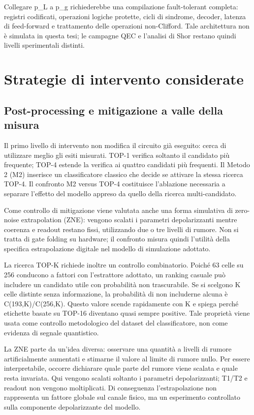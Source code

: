 Collegare p\_L a p\_g richiederebbe una compilazione fault-tolerant completa: registri codificati, operazioni logiche protette, cicli di sindrome, decoder, latenza di feed-forward e trattamento delle operazioni non-Clifford. Tale architettura non è simulata in questa tesi; le campagne QEC e l'analisi di Shor restano quindi livelli sperimentali distinti.

\section{Strategie di intervento considerate}\label{sec:finale_3_4}

\subsection{Post-processing e mitigazione a valle della misura}\label{sec:finale_3_4_1}

Il primo livello di intervento non modifica il circuito già eseguito: cerca di utilizzare meglio gli esiti misurati. TOP-1 verifica soltanto il candidato più frequente; TOP-4 estende la verifica ai quattro candidati più frequenti. Il Metodo 2 (M2) inserisce un classificatore classico che decide se attivare la stessa ricerca TOP-4. Il confronto M2 versus TOP-4 costituisce l'ablazione necessaria a separare l'effetto del modello appreso da quello della ricerca multi-candidato.

Come controllo di mitigazione viene valutata anche una forma simulativa di zero-noise extrapolation (ZNE): vengono scalati i parametri depolarizzanti mentre coerenza e readout restano fissi, utilizzando due o tre livelli di rumore. Non si tratta di gate folding su hardware; il confronto misura quindi l'utilità della specifica estrapolazione digitale nel modello di simulazione adottato.

La ricerca TOP-K richiede inoltre un controllo combinatorio. Poiché 63 celle su 256 conducono a fattori con l'estrattore adottato, un ranking casuale può includere un candidato utile con probabilità non trascurabile. Se si scelgono K celle distinte senza informazione, la probabilità di non includerne alcuna è C(193,K)/C(256,K). Questo valore scende rapidamente con K e spiega perché etichette basate su TOP-16 diventano quasi sempre positive. Tale proprietà viene usata come controllo metodologico del dataset del classificatore, non come evidenza di segnale quantistico.

La ZNE parte da un'idea diversa: osservare una quantità a livelli di rumore artificialmente aumentati e stimarne il valore al limite di rumore nullo. Per essere interpretabile, occorre dichiarare quale parte del rumore viene scalata e quale resta invariata. Qui vengono scalati soltanto i parametri depolarizzanti; T1/T2 e readout non vengono moltiplicati. Di conseguenza l'estrapolazione non rappresenta un fattore globale sul canale fisico, ma un esperimento controllato sulla componente depolarizzante del modello.

